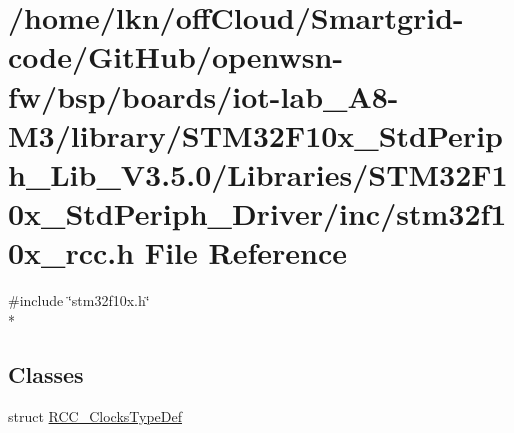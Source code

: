 \hypertarget{iot-lab___a8-_m3_2library_2_s_t_m32_f10x___std_periph___lib___v3_85_80_2_libraries_2_s_t_m32_f10332a049bb05702651d634e295a2d77dc}{}\section{/home/lkn/off\+Cloud/\+Smartgrid-\/code/\+Git\+Hub/openwsn-\/fw/bsp/boards/iot-\/lab\+\_\+\+A8-\/\+M3/library/\+S\+T\+M32\+F10x\+\_\+\+Std\+Periph\+\_\+\+Lib\+\_\+\+V3.5.0/\+Libraries/\+S\+T\+M32\+F10x\+\_\+\+Std\+Periph\+\_\+\+Driver/inc/stm32f10x\+\_\+rcc.h File Reference}
\label{iot-lab___a8-_m3_2library_2_s_t_m32_f10x___std_periph___lib___v3_85_80_2_libraries_2_s_t_m32_f10332a049bb05702651d634e295a2d77dc}
{\ttfamily \#include \char`\"{}stm32f10x.\+h\char`\"{}}\\*
\subsection*{Classes}
\begin{DoxyCompactItemize}
\item 
struct \hyperlink{struct_r_c_c___clocks_type_def}{R\+C\+C\+\_\+\+Clocks\+Type\+Def}
\end{DoxyCompactItemize}
